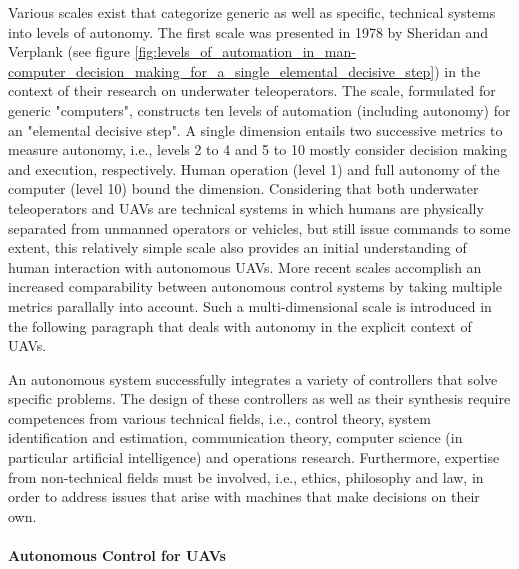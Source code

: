 Various scales exist that categorize generic as well as specific, technical systems into levels of autonomy. \cite{Williams}
The first scale was presented in 1978 by Sheridan and Verplank \cite{Sheridan1978} 
(see figure \ref{fig:levels_of_automation_in_man-computer_decision_making_for_a_single_elemental_decisive_step})
in the context of their research on underwater teleoperators.
The scale, formulated for generic "computers", constructs ten levels of automation (including autonomy) for an "elemental decisive step".
A single dimension entails two successive metrics to measure autonomy, i.e., levels 2 to 4 and 5 to 10 
mostly consider decision making and execution, respectively.
Human operation (level 1) and full autonomy of the computer (level 10) bound the dimension.
Considering that both underwater teleoperators and UAVs are technical systems 
in which humans are physically separated from unmanned operators or vehicles, but still issue commands to some extent,
this relatively simple scale also provides an initial understanding of human interaction with autonomous UAVs.
More recent scales accomplish an increased comparability between autonomous control systems by taking multiple metrics parallally into account.
Such a multi-dimensional scale is introduced in the following paragraph that deals with autonomy in the explicit context of UAVs.


An autonomous system successfully integrates a variety of controllers that solve specific problems.
The design of these controllers as well as their synthesis require competences from various technical fields,
i.e., control theory, system identification and estimation, communication theory,
computer science (in particular artificial intelligence) and operations research.
Furthermore, expertise from non-technical fields must be involved, i.e., ethics, philosophy and law,
in order to address issues that arise with machines that make decisions on their own.






\paragraph{Autonomous Control for UAVs}

